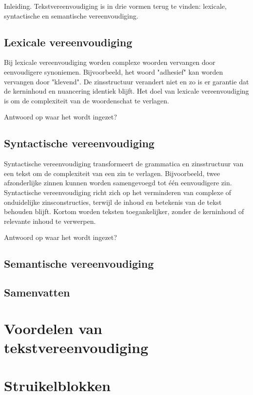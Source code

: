 Inleiding. Tekstvereenvoudiging is in drie vormen terug te vinden: lexicale, syntactische en semantische vereenvoudiging.

\subsection{Lexicale vereenvoudiging}

Bij lexicale vereenvoudiging worden complexe woorden vervangen door eenvoudigere synoniemen. Bijvoorbeeld, het woord "adhesief" kan worden vervangen door "klevend". De zinsstructuur verandert niet en zo is er garantie dat de kerninhoud en nuancering identiek blijft. Het doel van lexicale vereenvoudiging is om de complexiteit van de woordenschat te verlagen.

Antwoord op waar het wordt ingezet?

\subsection{Syntactische vereenvoudiging}

Syntactische vereenvoudiging transformeert de grammatica en zinsstructuur van een tekst om de complexiteit van een zin te verlagen. Bijvoorbeeld, twee afzonderlijke zinnen kunnen worden samengevoegd tot één eenvoudigere zin. Syntactische vereenvoudiging richt zich op het verminderen van complexe of onduidelijke zinsconstructies, terwijl de inhoud en betekenis van de tekst behouden blijft. Kortom worden teksten toegankelijker, zonder de kerninhoud of relevante inhoud te verwerpen.

Antwoord op waar het wordt ingezet?

\subsection{Semantische vereenvoudiging}

\subsection{Samenvatten}



\section{Voordelen van tekstvereenvoudiging}

\section{Struikelblokken}

